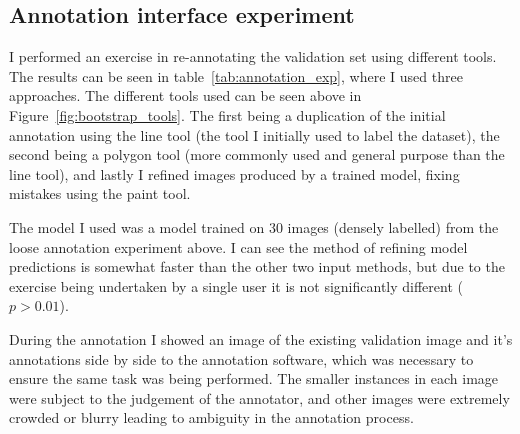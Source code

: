 \begin{table}[!ht]
  \centering
    \caption{Statistics from re-annotation test set}

\noindent{}

\label{tab:loose_exp}
\end{table}



\subsection {Annotation interface experiment}



I performed an exercise in re-annotating the validation set using different tools. The results can be seen in table~\ref{tab:annotation_exp}, where I used three approaches. The different tools used can be seen above in Figure~\ref{fig:bootstrap_tools}.  The first being a duplication of the initial annotation using the line tool (the tool I initially used to label the dataset), the second being a polygon tool (more commonly used and general purpose than the line tool), and lastly I refined images produced by a trained model, fixing mistakes using the paint tool.

The model I used was a model trained on 30 images (densely labelled) from the loose annotation experiment above. I can see the method of refining model predictions is somewhat faster than the other two input methods, but due to the exercise being undertaken by a single user it is not significantly different ($ p > 0.01 $).

During the annotation I showed an image of the existing validation image and it's annotations side by side to the annotation software, which was necessary to ensure the same task was being performed. The smaller instances in each image were subject to the judgement of the annotator, and other images were extremely crowded or blurry leading to ambiguity in the annotation process. 

